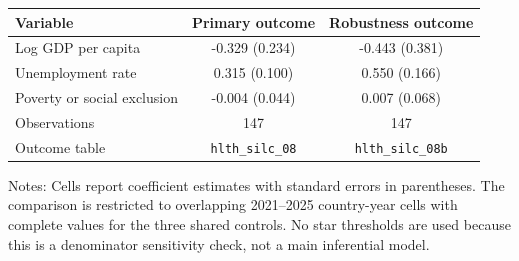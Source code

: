 \begin{tabular}{lcc}
\toprule
Variable & Primary outcome & Robustness outcome \\
\midrule
Log GDP per capita & -0.329 (0.234) & -0.443 (0.381) \\
Unemployment rate & 0.315 (0.100) & 0.550 (0.166) \\
Poverty or social exclusion & -0.004 (0.044) & 0.007 (0.068) \\
\midrule
Observations & 147 & 147 \\
Outcome table & \texttt{hlth\_silc\_08} & \texttt{hlth\_silc\_08b} \\
\bottomrule
\end{tabular}

\vspace{0.2em}
\begin{minipage}{0.82\textwidth}
\scriptsize Notes: Cells report coefficient estimates with standard errors in parentheses. The comparison is restricted to overlapping 2021--2025 country-year cells with complete values for the three shared controls. No star thresholds are used because this is a denominator sensitivity check, not a main inferential model.
\end{minipage}
